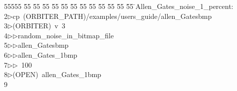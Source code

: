 %
%
\begin{tabbing}
55555 \= 55 \= 55 \= 55 \= 55 \= 55 \= 55 \= 55 \= 55 \= 55 \= 55 \= 55 \= 55 \= \>Allen\_Gates\_noise\_1\_percent:\\[0pt]
2\>$\triangleright$\>cp\ (ORBITER\_PATH)/examples/users\_guide/allen\_Gatesbmp\ \\[0pt]
3\>$\triangleright$\>(ORBITER)\ v\ 3\ \\[0pt]
4\>$\triangleright$\>$\triangleright$\>random\_noise\_in\_bitmap\_file\ \\[0pt]
5\>$\triangleright$\>$\triangleright$\>allen\_Gatesbmp\ \\[0pt]
6\>$\triangleright$\>$\triangleright$\>allen\_Gates\_1bmp\ \\[0pt]
7\>$\triangleright$\>$\triangleright$\ 100\ \\[0pt]
8\>$\triangleright$\>(OPEN)\ allen\_Gates\_1bmp\\[0pt]
9\>\end{tabbing}
